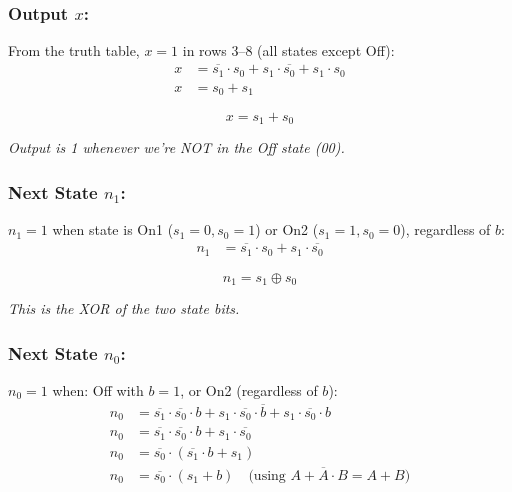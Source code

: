 \documentclass[12pt, a4paper]{article}
\begin{document}
\subsubsection*{Output $x$:}

From the truth table, $x = 1$ in rows 3--8 (all states except Off):
\begin{align*}
  x &= \overline{s_1} \cdot s_0 + s_1 \cdot \overline{s_0} + s_1 \cdot s_0 \\
  x &= s_0 + s_1
\end{align*}

\begin{equation}
  \boxed{x = s_1 + s_0}
\end{equation}

\textit{Output is 1 whenever we're NOT in the Off state (00).}

\subsubsection*{Next State $n_1$:}

$n_1 = 1$ when state is On1 ($s_1{=}0, s_0{=}1$) or On2 ($s_1{=}1, s_0{=}0$), regardless of $b$:
\begin{align*}
  n_1 &= \overline{s_1} \cdot s_0 + s_1 \cdot \overline{s_0}
\end{align*}

\begin{equation}
  \boxed{n_1 = s_1 \oplus s_0}
\end{equation}

\textit{This is the XOR of the two state bits.}

\subsubsection*{Next State $n_0$:}

$n_0 = 1$ when: Off with $b{=}1$, or On2 (regardless of $b$):
\begin{align*}
  n_0 &= \overline{s_1} \cdot \overline{s_0} \cdot b + s_1 \cdot \overline{s_0} \cdot \overline{b} + s_1 \cdot \overline{s_0} \cdot b \\
  n_0 &= \overline{s_1} \cdot \overline{s_0} \cdot b + s_1 \cdot \overline{s_0} \\
  n_0 &= \overline{s_0} \cdot (\overline{s_1} \cdot b + s_1) \\
  n_0 &= \overline{s_0} \cdot (s_1 + b) \quad \text{(using } A + \overline{A} \cdot B = A + B \text{)}
\end{align*}
\end{document}
